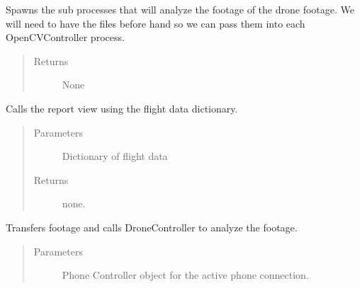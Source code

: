 \documentclass[letterpaper,10pt,english]{sphinxmanual}
\begin{document}
\begin{fulllineitems}
\begin{fulllineitems}
\label{\detokenize{index:src.Controllers.Program_Controller.Controller.start_analysis}}
Spawns the sub processes that will analyze the footage of the drone footage. We will need
to have the files before hand so we can pass them into each OpenCVController process.
\begin{quote}\begin{description}
\item[{Returns}] \leavevmode
None

\end{description}\end{quote}

\end{fulllineitems}


\begin{fulllineitems}
\label{\detokenize{index:src.Controllers.Program_Controller.Controller.transfer_complete}}
Calls the report view using the flight data dictionary.
\begin{quote}\begin{description}
\item[{Parameters}] \leavevmode
{} \textendash{} Dictionary of flight data

\item[{Returns}] \leavevmode
none.

\end{description}\end{quote}

\end{fulllineitems}


\begin{fulllineitems}
\label{\detokenize{index:src.Controllers.Program_Controller.Controller.transfer_footage}}
Transfers footage and calls DroneController to analyze the footage.
\begin{quote}\begin{description}
\item[{Parameters}] \leavevmode
{} \textendash{} Phone Controller object for the active phone connection.


\end{description}
\end{quote}
\end{fulllineitems}
\end{fulllineitems}
\end{document}
